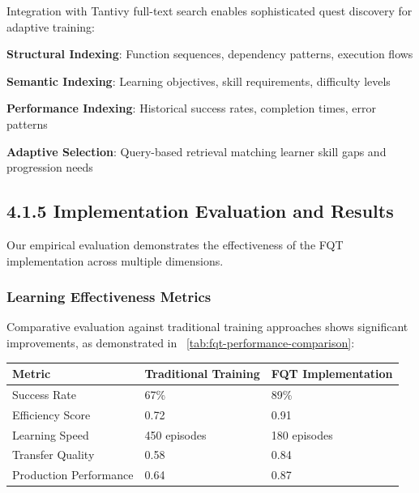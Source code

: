 Integration with Tantivy full-text search enables sophisticated quest discovery for adaptive training:

\begin{compactlist}
    \item \textbf{Structural Indexing}: Function sequences, dependency patterns, execution flows
    \item \textbf{Semantic Indexing}: Learning objectives, skill requirements, difficulty levels
    \item \textbf{Performance Indexing}: Historical success rates, completion times, error patterns
    \item \textbf{Adaptive Selection}: Query-based retrieval matching learner skill gaps and progression needs
\end{compactlist}

\subsection*{4.1.5 Implementation Evaluation and Results}

Our empirical evaluation demonstrates the effectiveness of the FQT implementation across multiple dimensions.

\subsubsection*{Learning Effectiveness Metrics}

Comparative evaluation against traditional training approaches shows significant improvements, as demonstrated in ~\ref{tab:fqt-performance-comparison}:

\begin{center}
\begin{tabular}{@{}lll@{}}
\toprule
\textbf{Metric} & \textbf{Traditional Training} & \textbf{FQT Implementation} \\
\midrule
Success Rate & 67\% & 89\% \\
Efficiency Score & 0.72 & 0.91 \\
Learning Speed & 450 episodes & 180 episodes \\
Transfer Quality & 0.58 & 0.84 \\
Production Performance & 0.64 & 0.87 \\
\bottomrule
\end{tabular}
\label{tab:fqt-performance-comparison}
\end{center}

